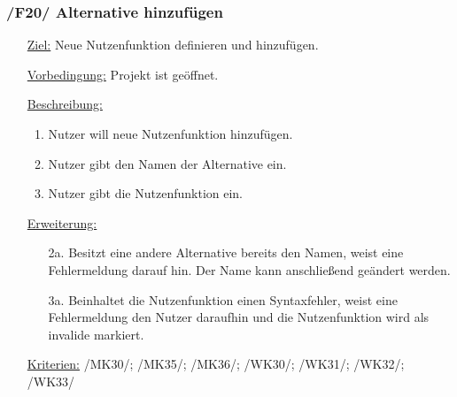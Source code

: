 \documentclass{article}
\begin{document}
\subsubsection*{\textbf{/F20/} Alternative hinzufügen} \label{sec:f:Alternative hinzufügen}
\begin{itemize}
    \item[\underline{Ziel:}] Neue Nutzenfunktion definieren und hinzufügen.
    \item[\underline{Vorbedingung:}] Projekt ist geöffnet.
    \item[\underline{Beschreibung:}]
    \begin{enumerate}
        \item Nutzer will neue Nutzenfunktion hinzufügen.
        \item Nutzer gibt den Namen der Alternative ein.
        \item Nutzer gibt die Nutzenfunktion ein.
    \end{enumerate}
    \item[\underline{Erweiterung:}]
    \begin{itemize}
        \item[2a.] Besitzt eine andere Alternative bereits den Namen, weist eine Fehlermeldung darauf hin. Der Name kann anschließend geändert werden.
        \item[3a.] Beinhaltet die Nutzenfunktion einen Syntaxfehler, weist eine Fehlermeldung den Nutzer daraufhin und die Nutzenfunktion wird als invalide markiert. 
    \end{itemize}
    \item[\underline{Kriterien:}] /MK30/; /MK35/; /MK36/; /WK30/; /WK31/; /WK32/; /WK33/
\end{itemize}
\end{document}
